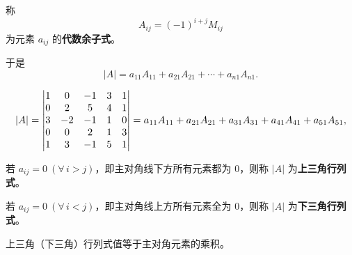 \usetikzlibrary{matrix}

\begin{definition}[$n$ 阶行列式的代数余子式]
称
\[
A_{ij}=(-1)^{i+j}M_{ij}
\]
为元素 $a_{ij}$ 的\textbf{代数余子式}。
\end{definition}

于是
\[
|A|=a_{11}A_{11}+a_{21}A_{21}+\cdots+a_{n1}A_{n1}.
\]

\begin{example}
\[
\resizebox{0.98\linewidth}{!}{$\displaystyle
|A|=\begin{vmatrix}
1 & 0 & -1 & 3 & 1\\
0 & 2 & 5 & 4 & 1\\
3 & -2 & -1 & 1 & 0\\
0 & 0 & 2 & 1 & 3\\
1 & 3 & -1 & 5 & 1
\end{vmatrix}
=a_{11}A_{11}+a_{21}A_{21}+a_{31}A_{31}+a_{41}A_{41}+a_{51}A_{51}$},
\]
\end{example}

\begin{definition}[$n$ 阶上、下三角行列式]
若 $a_{ij}=0\ (\forall\,i>j)$，即主对角线下方所有元素都为 $0$，则称 $|A|$ 为\textbf{上三角行列式}。

若 $a_{ij}=0\ (\forall\,i<j)$，即主对角线上方所有元素全为 $0$，则称 $|A|$ 为\textbf{下三角行列式}。
\end{definition}

\begin{proposition}[性质 1]
上三角（下三角）行列式值等于主对角元素的乘积。
\end{proposition}

